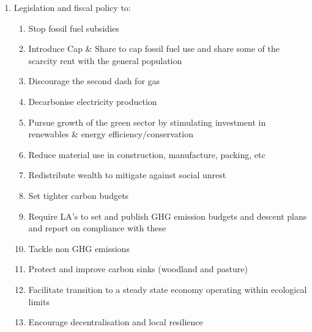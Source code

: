 \documentclass[12pt]{article}
\begin{document}
\begin{enumerate}
\begin{enumerate}
\begin{enumerate}
            \end{enumerate}

          \item Legislation and fiscal policy to:

            \begin{enumerate}

              \item Stop fossil fuel subsidies

              \item Introduce Cap \& Share to cap fossil fuel use and share some of the scarcity rent with the general population

              \item Discourage the second dash for gas

              \item Decarbonise electricity production

              \item Pursue growth of the green sector by stimulating investment in renewables \& energy efficiency/conservation

              \item Reduce material use in construction, manufacture, packing, etc

              \item Redistribute wealth to mitigate against social unrest

              \item Set tighter carbon budgets

              \item Require LA’s to set and publish GHG emission budgets and descent plans and report on compliance with these

              \item Tackle non GHG emissions

              \item Protect and improve carbon sinks (woodland and pasture)

              \item Facilitate transition to a steady state economy operating within ecological limits

              \item Encourage decentralisation and local resilience

            \end{enumerate}

        \end{enumerate}


\end{enumerate}
\end{document}
